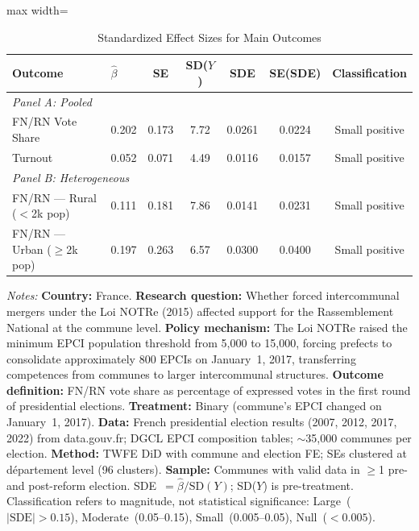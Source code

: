 \begin{table}[H]
\centering
\caption{Standardized Effect Sizes for Main Outcomes}
\label{tab:sde}
\begin{adjustbox}{max width=\textwidth}
\begin{tabular}{llccccc}
\toprule
Outcome & $\hat{\beta}$ & SE & SD($Y$) & SDE & SE(SDE) & Classification \\
\midrule
\multicolumn{7}{l}{\textit{Panel A: Pooled}} \\
FN/RN Vote Share & 0.202 & 0.173 & 7.72 & 0.0261 & 0.0224 & Small positive \\
Turnout & 0.052 & 0.071 & 4.49 & 0.0116 & 0.0157 & Small positive \\
\midrule
\multicolumn{7}{l}{\textit{Panel B: Heterogeneous}} \\
FN/RN --- Rural ($<$2k pop) & 0.111 & 0.181 & 7.86 & 0.0141 & 0.0231 & Small positive \\
FN/RN --- Urban ($\geq$2k pop) & 0.197 & 0.263 & 6.57 & 0.0300 & 0.0400 & Small positive \\
\bottomrule
\end{tabular}
\end{adjustbox}
\par\vspace{0.5em}
{\scriptsize \textit{Notes:}
\textbf{Country:} France.
\textbf{Research question:} Whether forced intercommunal mergers under the Loi NOTRe (2015) affected support for the Rassemblement National at the commune level.
\textbf{Policy mechanism:} The Loi NOTRe raised the minimum EPCI population threshold from 5,000 to 15,000, forcing prefects to consolidate approximately 800 EPCIs on January~1, 2017, transferring competences from communes to larger intercommunal structures.
\textbf{Outcome definition:} FN/RN vote share as percentage of expressed votes in the first round of presidential elections.
\textbf{Treatment:} Binary (commune's EPCI changed on January~1, 2017).
\textbf{Data:} French presidential election results (2007, 2012, 2017, 2022) from data.gouv.fr; DGCL EPCI composition tables; ${\sim}$35,000 communes per election.
\textbf{Method:} TWFE DiD with commune and election FE; SEs clustered at d\'{e}partement level (96 clusters).
\textbf{Sample:} Communes with valid data in ${\geq}$1 pre- and post-reform election.
SDE~$= \hat{\beta}/\mathrm{SD}(Y)$; SD($Y$) is pre-treatment.
Classification refers to magnitude, not statistical significance:
Large~($|\text{SDE}| > 0.15$),
Moderate~(0.05--0.15),
Small~(0.005--0.05),
Null~($< 0.005$).}
\end{table}
